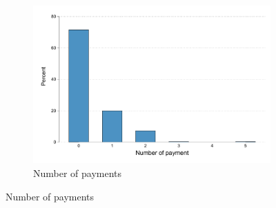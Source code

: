 \documentclass[11pt]{article}
\begin{document}
\begin{figure}[H]
\begin{center}
\begin{subfigure}{0.45\textwidth}
    \end{subfigure}
    \begin{subfigure}{0.45\textwidth}
        \caption{Number of payments}
        \centering
        \includegraphics[width=\textwidth]{Figuras/hist_numpay_default.pdf}
    \end{subfigure}
    \end{center}
\end{figure}
\end{document}
